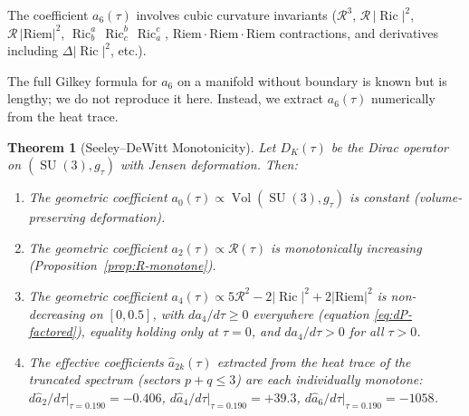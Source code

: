\documentclass[12pt]{article}
\newtheorem{theorem}{Theorem}
\theoremstyle{definition}
\theoremstyle{remark}
\DeclareMathOperator{\Ric}{Ric}
\DeclareMathOperator{\Vol}{Vol}
\DeclareMathOperator{\SU}{SU}
\begin{document}
{\sloppy The coefficient $a_6(\tau)$ involves cubic curvature invariants
($\mathcal{R}^3$, $\mathcal{R}\,|\Ric|^2$,
$\mathcal{R}\,|\mathrm{Riem}|^2$, $\Ric^a_b\,\Ric^b_c\,\Ric^c_a$,
$\mathrm{Riem}\cdot\mathrm{Riem}\cdot\mathrm{Riem}$ contractions, and
derivatives including $\Delta|\Ric|^2$, etc.).\par}  The full Gilkey formula
for $a_6$ on a manifold without boundary is known
\cite{Gilkey1995, Vassilevich2003} but is lengthy;
we do not reproduce it here.  Instead, we extract $a_6(\tau)$
numerically from the heat trace.

\begin{theorem}[Seeley--DeWitt Monotonicity]\label{thm:SD-mono}
Let $D_K(\tau)$ be the Dirac operator on $(\SU(3), g_\tau)$ with
Jensen deformation.  Then:
\begin{enumerate}
\item[(i)]   The geometric coefficient $a_0(\tau) \propto \Vol(\SU(3), g_\tau)$
  is constant (volume-preserving deformation).
\item[(ii)]  The geometric coefficient $a_2(\tau) \propto \mathcal{R}(\tau)$
  is monotonically increasing
  (Proposition~\ref{prop:R-monotone}).
\item[(iii)] The geometric coefficient $a_4(\tau) \propto
  5\mathcal{R}^2 - 2|\Ric|^2 + 2|\mathrm{Riem}|^2$ is non-decreasing on
  $[0, 0.5]$, with $da_4/d\tau \geq 0$ everywhere (equation
  \eqref{eq:dP-factored}), equality holding only at $\tau=0$, and
  $da_4/d\tau > 0$ for all $\tau>0$.
\item[(iv)]  The \emph{effective coefficients} $\hat{a}_{2k}(\tau)$
  extracted from the heat trace of the truncated spectrum (sectors
  $p+q \leq 3$) are each individually monotone:
  $d\hat{a}_2/d\tau|_{\tau=0.190} = -0.406$,
  $d\hat{a}_4/d\tau|_{\tau=0.190} = +39.3$,
  $d\hat{a}_6/d\tau|_{\tau=0.190} = -1058$.
\end{enumerate}
\end{theorem}
\end{document}
